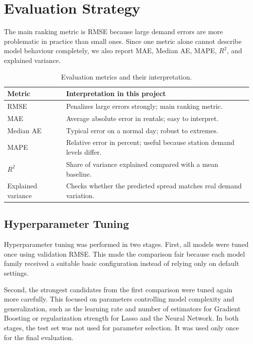 \section{Evaluation Strategy}
\label{sec:evaluation}

The main ranking metric is RMSE because large demand errors are more 
problematic in practice than small ones. Since one metric alone cannot 
describe model behaviour completely, we also report MAE, Median AE, 
MAPE, $R^2$, and explained variance.

\begin{table}[htbp]
\caption{Evaluation metrics and their interpretation.}
\label{tab:metrics}
\centering
\scriptsize
\begin{tabularx}{\columnwidth}{p{} X}
\toprule
\textbf{Metric} & \textbf{Interpretation in this project} \\
\midrule
RMSE & Penalizes large errors strongly; main ranking metric. \\
\addlinespace
MAE & Average absolute error in rentals; easy to interpret. \\
\addlinespace
Median AE & Typical error on a normal day; robust to extremes. \\
\addlinespace
MAPE & Relative error in percent; useful because station demand levels differ. \\
\addlinespace
$R^2$ & Share of variance explained compared with a mean baseline. \\
\addlinespace
Explained variance & Checks whether the predicted spread matches real demand variation. \\
\bottomrule
\end{tabularx}
\end{table}

\subsection{Hyperparameter Tuning}

Hyperparameter tuning was performed in two stages. First, all models 
were tuned once using validation RMSE. This made the comparison fair 
because each model family received a suitable basic configuration 
instead of relying only on default settings.

Second, the strongest candidates from the first comparison were tuned 
again more carefully. This focused on parameters controlling model 
complexity and generalization, such as the learning rate and number of 
estimators for Gradient Boosting or regularization strength for Lasso 
and the Neural Network. In both stages, the test set was not used for 
parameter selection. It was used only once for the final evaluation.

